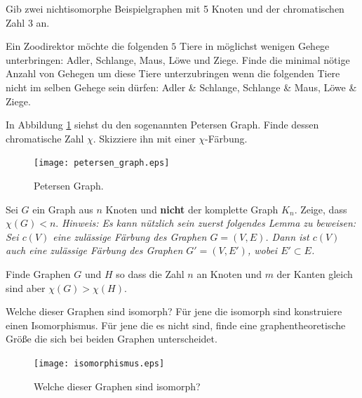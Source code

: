 \subexercise[%
  topic=Chromatische Zahl,
    ]
Gib zwei nichtisomorphe Beispielgraphen mit 5 Knoten und der chromatischen Zahl 3 an.

\subexercise[%
  topic=Zoodirektor,
    ]
    Ein Zoodirektor m\"ochte die folgenden $5$ Tiere in m\"oglichst wenigen Gehege unterbringen: Adler, Schlange, Maus, L\"owe und Ziege. Finde die minimal n\"otige Anzahl von Gehegen um diese Tiere unterzubringen wenn die folgenden Tiere nicht im selben Gehege sein d\"urfen: Adler \& Schlange, Schlange \& Maus, L\"owe \& Ziege.


\subexercise[%
  topic=Petersen Graph,
    ]
    In Abbildung \ref{petersen} siehst du den sogenannten Petersen Graph. Finde dessen chromatische Zahl $\chi$. Skizziere ihn mit einer $\chi$-F\"arbung.

\begin{figure}[h]
    \centering
    \texttt{[image: petersen\_graph.eps]}
    \caption{\label{petersen} Petersen Graph.}

\end{figure}

\subexercise[%
  topic=Eine Obergrenze f\"ur die chromatische Zahl,
    ]
Sei $G$ ein Graph aus $n$ Knoten und {\bf nicht} der komplette Graph $K_n$. Zeige, dass $\chi (G) < n$.
\emph{Hinweis: Es kann n\"utzlich sein zuerst folgendes Lemma zu beweisen: Sei $c(V)$ eine zul\"assige F\"arbung des Graphen $G=(V,E)$. Dann ist $c(V)$ auch eine zul\"assige F\"arbung des Graphen $G'=(V,E')$, wobei $E'\subset E$.}


\subexercise[%
  topic=Graphen gleicher Gr\"o\ss e mit unterschiedlichem Chromatischer Zahl,
    ]
		
		Finde Graphen $G$ und $H$ so dass die Zahl $n$ an Knoten und $m$ der Kanten gleich sind aber $\chi (G)> \chi (H)$.


\exercise[%
  topic = Graphisomorphismus 
    ]
		
		\subexercise[%
  topic=Isomorphie von Graphen untersuchen,
    ]
		
		Welche dieser Graphen sind isomorph? F\"ur jene die isomorph sind konstruiere einen Isomorphismus. F\"ur jene die es nicht sind, finde eine graphentheoretische Gr\"o\ss e die sich bei beiden Graphen unterscheidet.
		\begin{figure}[h]
    \centering
    \texttt{[image: isomorphismus.eps]}
    \caption{\label{isomorphismus} Welche dieser Graphen sind isomorph?}

\end{figure}

